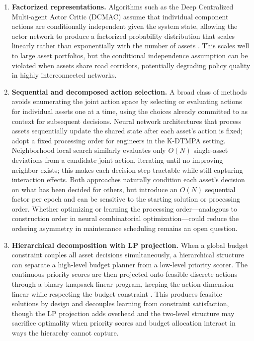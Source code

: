 \documentclass[3p, twocolumn]{elsarticle}
\begin{document}
\begin{enumerate}
    \item \textbf{Factorized representations.} Algorithms such as the Deep Centralized Multi-agent Actor Critic (DCMAC) assume that individual component actions are conditionally independent given the system state, allowing the actor network to produce a factorized probability distribution that scales linearly rather than exponentially with the number of assets \citep{andriotis_managing_2019}. This scales well to large asset portfolios, but the conditional independence assumption can be violated when assets share road corridors, potentially degrading policy quality in highly interconnected networks.

    \item \textbf{Sequential and decomposed action selection.} A broad class of methods avoids enumerating the joint action space by selecting or evaluating actions for individual assets one at a time, using the choices already committed to as context for subsequent decisions. Neural network architectures that process assets sequentially update the shared state after each asset's action is fixed; \citet{verleijsdonkScalablePoliciesDynamic2024} adopt a fixed processing order for engineers in the K-DTMPA setting. Neighborhood local search similarly evaluates only $O(N)$ single-asset deviations from a candidate joint action, iterating until no improving neighbor exists; this makes each decision step tractable while still capturing interaction effects. Both approaches naturally condition each asset's decision on what has been decided for others, but introduce an $O(N)$ sequential factor per epoch and can be sensitive to the starting solution or processing order. Whether optimizing or learning the processing order---analogous to construction order in neural combinatorial optimization---could reduce the ordering asymmetry in maintenance scheduling remains an open question.

    \item \textbf{Hierarchical decomposition with LP projection.} When a global budget constraint couples all asset decisions simultaneously, a hierarchical structure can separate a high-level budget planner from a low-level priority scorer. The continuous priority scores are then projected onto feasible discrete actions through a binary knapsack linear program, keeping the action dimension linear while respecting the budget constraint \citep{fard_hierarchical_2025}. This produces feasible solutions by design and decouples learning from constraint satisfaction, though the LP projection adds overhead and the two-level structure may sacrifice optimality when priority scores and budget allocation interact in ways the hierarchy cannot capture.


\end{enumerate}
\end{document}
